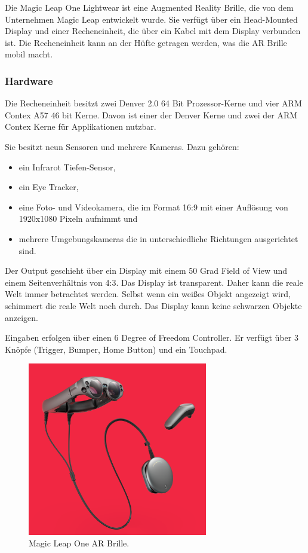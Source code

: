 Die Magic Leap One Lightwear ist eine Augmented Reality Brille, die von dem Unternehmen Magic Leap entwickelt wurde. Sie verfügt über ein Head-Mounted Display und einer Recheneinheit, die über ein Kabel mit dem Display verbunden ist. Die Recheneinheit kann an der Hüfte getragen werden, was die AR Brille mobil macht. 


\subsubsection{Hardware}

Die Recheneinheit besitzt zwei Denver 2.0 64 Bit Prozessor-Kerne und vier ARM Contex A57 46 bit Kerne. Davon ist einer der Denver Kerne und zwei der ARM Contex Kerne für Applikationen nutzbar.  

Sie besitzt neun Sensoren und mehrere Kameras. Dazu gehören:
\begin{itemize}
	\item ein Infrarot Tiefen-Sensor,
	\item ein Eye Tracker,
	\item eine Foto- und Videokamera, die im Format 16:9 mit einer Auflösung von 1920x1080 Pixeln aufnimmt und
	\item mehrere Umgebungskameras die in unterschiedliche Richtungen ausgerichtet sind. \citep{mlofficialsalespitch,mlglossary}
\end{itemize}

Der Output geschieht über ein Display mit einem 50 Grad Field of View und einem Seitenverhältnis von 4:3. Das Display ist transparent. Daher kann die reale Welt immer betrachtet werden. Selbst wenn ein weißes Objekt angezeigt wird, schimmert die reale Welt noch durch. 
Das Display kann keine schwarzen Objekte anzeigen. 

Eingaben erfolgen über einen 6 Degree of Freedom Controller. Er verfügt über 3 Knöpfe (Trigger, Bumper, Home Button) und ein Touchpad. \citep{mlofficialsalespitch,mlglossary}

\begin{figure}[H]
	\centering
	\includegraphics[width=0.7\textwidth]{images/img_magicLeap.PNG}
	\caption[Magic Leap One AR Brille.\citep{mlImage}]{Magic Leap One AR Brille.\citep{mlImage}}
	\label{magcileap}
\end{figure}

